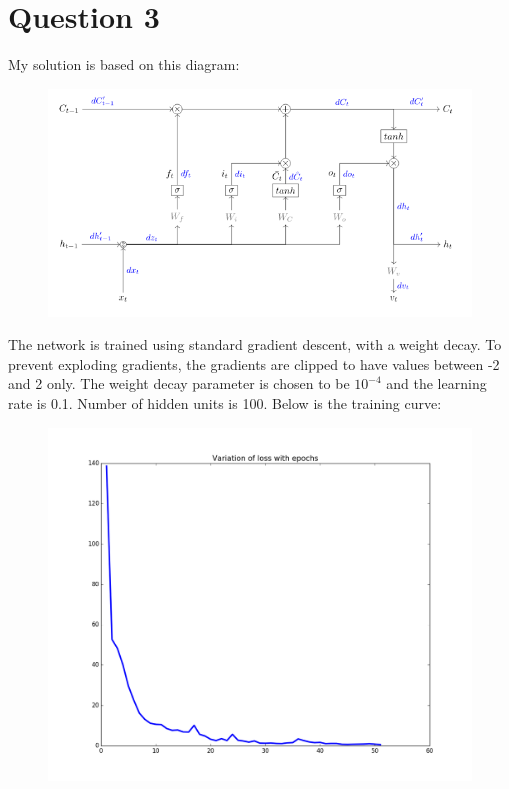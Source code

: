 \documentclass{article}
\begin{document}
\section*{Question 3}
\begin{flushleft}
My solution is based on this diagram:
\begin{figure}[H]
\centering
\includegraphics[width=0.5\linewidth]{lstm-map.png}
\end{figure}

The network is trained using standard gradient descent, with a weight decay. To prevent exploding gradients, the gradients are clipped to have values between -2 and 2 only. The weight decay parameter is chosen to be \(10^{-4}\) and the learning rate is 0.1. Number of hidden units is 100. Below is the training curve:
\begin{figure}[H]
\centering
\includegraphics[width=0.75\linewidth]{LSTM_training.png}
\end{figure}


\end{flushleft}
\end{document}
